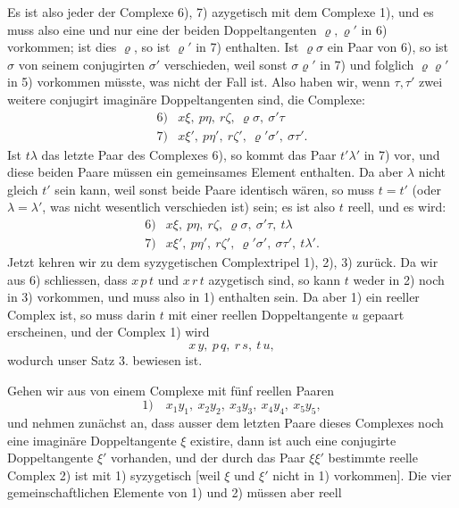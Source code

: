 Es ist also jeder der Complexe 6), 7) azygetisch mit dem Complexe 1),
und es muss also eine und nur eine der beiden Doppeltangenten
$\varrho, \varrho'$ in 6) vorkommen; ist dies $\varrho$, so ist $\varrho'$ in
7) enthalten. Ist $\varrho\sigma$ ein Paar von 6), so ist $\sigma$ von seinem
conjugirten $\sigma'$ verschieden, weil sonst $\sigma\varrho'$ in 7) und folglich
$\varrho\varrho'$ in 5) vorkommen müsste, was nicht der Fall ist. Also haben
wir, wenn $\tau, \tau'$ zwei weitere conjugirt imaginäre Doppeltangenten
sind, die Complexe:
\[
\begin{array}{rl}
6) & x\xi,\ p\eta,\ r\zeta,\ \varrho\sigma,\ \sigma'\tau \\
7) & x\xi',\ p\eta',\ r\zeta',\ \varrho'\sigma',\ \sigma\tau'.
\end{array}
\]
Ist $t\lambda$ das letzte Paar des Complexes 6), so kommt das Paar
$t'\lambda'$ in 7) vor, und diese beiden Paare müssen ein gemeinsames
Element enthalten. Da aber $\lambda$ nicht gleich $t'$ sein kann, weil sonst
beide Paare identisch wären, so muss $t = t'$ (oder $\lambda = \lambda'$, was
nicht wesentlich verschieden ist) sein; es ist also $t$ reell, und es
wird:
\[
\begin{array}{rl}
6) & x\xi,\ p\eta,\ r\zeta,\ \varrho\sigma,\ \sigma'\tau,\ t\lambda \\
7) & x\xi',\ p\eta',\ r\zeta',\ \varrho'\sigma',\ \sigma\tau',\ t\lambda'.
\end{array}
\]
Jetzt kehren wir zu dem syzygetischen Complextripel 1), 2), 3) zurück.
Da wir aus 6) schliessen, dass $x\,p\,t$ und $x\,r\,t$ azygetisch sind, so
kann $t$ weder in 2) noch in 3) vorkommen, und muss also in 1)
enthalten sein. Da aber 1) ein reeller Complex ist, so muss darin $t$
mit einer reellen Doppeltangente $u$ gepaart erscheinen, und der
Complex 1) wird
\[
x\,y,\ p\,q,\ r\,s,\ t\,u,
\]
wodurch unser Satz 3. bewiesen ist.


Gehen wir aus von einem Complexe mit fünf reellen Paaren
\[
1)\quad x_1y_1,\ x_2y_2,\ x_3y_3,\ x_4y_4,\ x_5y_5,
\]
und nehmen zunächst an, dass ausser dem letzten Paare dieses
Complexes noch eine imaginäre Doppeltangente $\xi$ existire, dann ist
auch eine conjugirte Doppeltangente $\xi'$ vorhanden, und der durch das
Paar $\xi\xi'$ bestimmte reelle Complex 2) ist mit 1) syzygetisch [weil
$\xi$ und $\xi'$ nicht in 1) vorkommen]. Die vier gemeinschaftlichen
Elemente von 1) und 2) müssen aber reell
